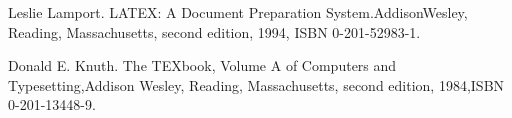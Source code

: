 \documentclass[a4paper,12pt]{report}
\begin{document}

\begin{thebibliography}{99}
\songti {} 	
	Leslie Lamport. LATEX: A Document Preparation System.AddisonWesley, Reading, Massachusetts, second edition, 1994, ISBN 0-201-52983-1.
	
	Donald E. Knuth. The TEXbook, Volume A of Computers and Typesetting,Addison Wesley, Reading, Massachusetts, second edition, 1984,ISBN 0-201-13448-9.

	
\end{thebibliography}

\end{document}
